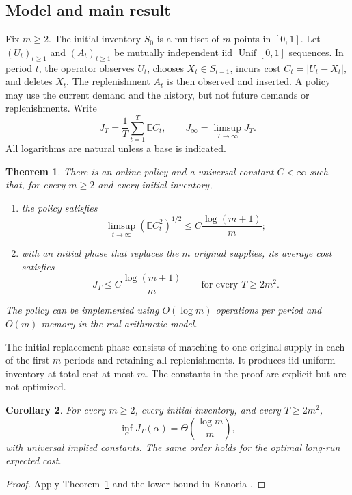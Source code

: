 \documentclass[11pt]{article}
\numberwithin{equation}{section}
\newtheorem{theorem}{Theorem}[section]
\newtheorem{corollary}[theorem]{Corollary}
\theoremstyle{remark}
\newcommand{\E}{\mathbb E}
\newcommand{\Unif}{\operatorname{Unif}}
\begin{document}
\subsection{Model and main result}

Fix \(m\ge2\). The initial inventory \(S_0\) is a multiset of \(m\) points
in \([0,1]\). Let \((U_t)_{t\ge1}\) and \((A_t)_{t\ge1}\) be mutually
independent iid \(\Unif[0,1]\) sequences. In period \(t\), the operator
observes \(U_t\), chooses \(X_t\in S_{t-1}\), incurs cost
\(C_t=|U_t-X_t|\), and deletes \(X_t\). The replenishment \(A_t\) is
then observed and inserted. A policy may use the current demand and the
history, but not future demands or replenishments. Write
\[
J_T=\frac1T\sum_{t=1}^T\E C_t,
\qquad J_\infty=\limsup_{T\to\infty}J_T.
\]
All logarithms are natural unless a base is indicated.

\begin{theorem}\label{thm:main}
There is an online policy and a universal constant \(C<\infty\) such
that, for every \(m\ge2\) and every initial inventory,
\begin{enumerate}[label=(\roman*)]
\item the policy satisfies
\[
\limsup_{t\to\infty}(\E C_t^2)^{1/2}
\le C\frac{\log(m+1)}m;
\]
\item with an initial phase that replaces the \(m\) original supplies,
its average cost satisfies
\[
J_T\le C\frac{\log(m+1)}m
\qquad\text{for every }T\ge2m^2.
\]
\end{enumerate}
The policy can be implemented using \(O(\log m)\) operations per period
and \(O(m)\) memory in the real-arithmetic model.
\end{theorem}

The initial replacement phase consists of matching to one original supply
in each of the first \(m\) periods and retaining all replenishments.
It produces iid uniform inventory at total cost at most \(m\).
The constants in the proof are explicit but are not optimized.

\begin{corollary}\label{cor:sharp}
For every \(m\ge2\), every initial inventory, and every \(T\ge2m^2\),
\[
\inf_\alpha J_T(\alpha)=\Theta\!\left(\frac{\log m}{m}\right),
\]
with universal implied constants. The same order holds for the optimal
long-run expected cost.
\end{corollary}
\begin{proof}
Apply Theorem~\ref{thm:main} and the lower bound in
Kanoria \cite[Theorem~3]{Kanoria}.
\end{proof}
\end{document}
